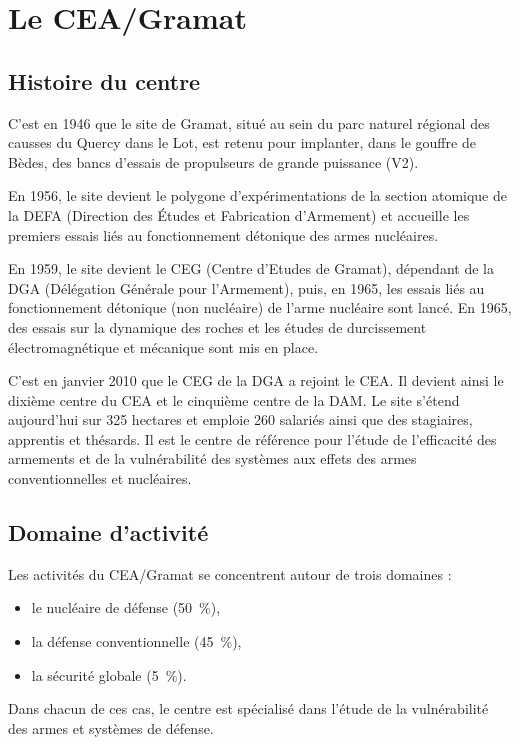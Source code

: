 \section{Le CEA/Gramat}

\subsection{Histoire du centre}

C’est en 1946 que le site de Gramat, situé au sein du parc naturel régional des causses du Quercy dans le Lot, est retenu pour implanter, dans le gouffre de Bèdes, des bancs d’essais de propulseurs de grande puissance (V2).

En 1956, le site devient le polygone d’expérimentations de la section atomique de la DEFA (Direction des Études et Fabrication d’Armement) et accueille les premiers essais liés au fonctionnement détonique des armes nucléaires.

En 1959, le site devient le CEG (Centre d’Etudes de Gramat), dépendant de la DGA (Délégation Générale pour l’Armement), puis, en 1965, les essais liés au fonctionnement détonique (non nucléaire) de l’arme nucléaire sont lancé. En 1965, des essais sur la dynamique des roches et les études de durcissement électromagnétique et mécanique sont mis en place.

C’est en janvier 2010 que le CEG de la DGA a rejoint le CEA. Il devient ainsi le dixième centre du CEA et le cinquième centre de la DAM.
Le site s’étend aujourd’hui sur 325 hectares et emploie 260 salariés ainsi que des stagiaires, apprentis et thésards. Il est le centre de référence pour l’étude de l’efficacité des armements et de la vulnérabilité des systèmes aux effets des armes conventionnelles et nucléaires.


\subsection{Domaine d'activité}

Les activités du CEA/Gramat se concentrent autour de trois domaines :
\begin{itemize}
\item{le nucléaire de défense (50~\%),}
\item{la défense conventionnelle (45~\%),}
\item{la sécurité globale (5~\%).}
\end{itemize}

Dans chacun de ces cas, le centre est spécialisé dans l’étude de la vulnérabilité des armes et systèmes de défense.

